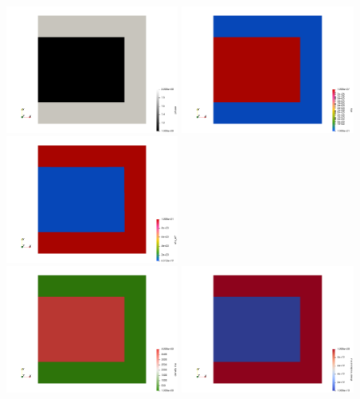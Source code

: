\begin{center}
\includegraphics[width=5.7cm]{python_codes/fieldstone_129/results/experiment3/phase}
\includegraphics[width=5.7cm]{python_codes/fieldstone_129/results/experiment3/eta}
\includegraphics[width=5.7cm]{python_codes/fieldstone_129/results/experiment3/etaeff}\\
\includegraphics[width=5.7cm]{python_codes/fieldstone_129/results/experiment3/rho}
\includegraphics[width=5.7cm]{python_codes/fieldstone_129/results/experiment3/mu}

\end{center}
